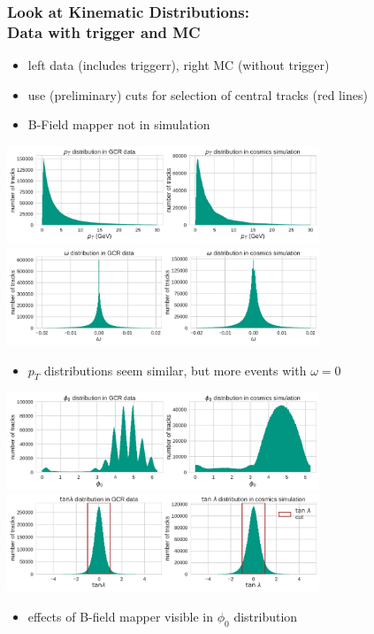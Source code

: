 \documentclass[18pt]{beamer}
\begin{document}
  \begin{frame}
    \frametitle{Look at Kinematic Distributions:\\Data with trigger and MC}
    \begin{itemize}
    \item left data (includes triggerr), right MC (without trigger)
    \item use (preliminary) cuts for selection of central tracks (red lines)
    \item B-Field mapper not in simulation
    \end{itemize}
    \begin{center}
      \includegraphics[width=0.7\textwidth]{figures/distributions/gcr_pt_distribution_uncut.pdf}\\
      \includegraphics[width=0.7\textwidth]{figures/distributions/gcr_omega_distribution_uncut.pdf}
    \end{center}
    \begin{itemize}
    \item $p_T$ distributions seem similar, but more events with $\omega = 0$
    \end{itemize}
  \end{frame}

  \begin{frame}
    \begin{center}
      \includegraphics[width=0.7\textwidth]{figures/distributions/gcr_phi0_distribution_uncut.pdf}\\
      \includegraphics[width=0.7\textwidth]{figures/distributions/gcr_tan_lambda_distribution_uncut.pdf}
    \end{center}

    \begin{itemize}
    \item effects of B-field mapper visible in $\phi_0$ distribution
    \end{itemize}
  \end{frame}
\end{document}
